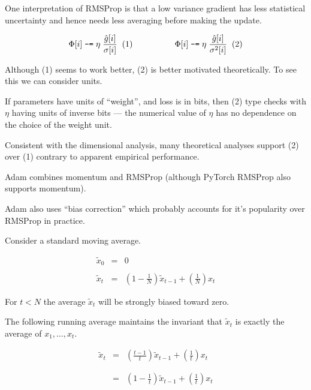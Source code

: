 {\vfill
One interpretation of RMSProp is that a low variance gradient has less statistical uncertainty and hence needs less averaging before making the update.


{\color{red} $$\Phi[i] \;\mbox{\tt -=} \; \eta\;\frac{\hat{g}[i]}{\sigma[i]}\;\;(1)\hspace{5em}\Phi[i] \;\mbox{\tt -=} \; \eta\;\frac{\hat{g}[i]}{\sigma^2[i]}\;\;(2)$$}

\vfill
Although (1) seems to work better, (2) is better motivated theoretically.  To see this we can consider units.

\vfill
If parameters have units of ``weight'', and loss is in bits, then (2) type checks with $\eta$ having units of inverse bits --- the numerical value of $\eta$
has no dependence on the choice of the weight unit.

\vfill
Consistent with the dimensional analysis, many theoretical analyses support (2) over (1) contrary to apparent empirical performance.

Adam combines momentum and RMSProp (although PyTorch RMSProp also supports momentum).

\vfill
Adam also uses ``bias correction'' which probably accounts for it's popularity over RMSProp in practice.


Consider a standard moving average.

\begin{eqnarray*}
\tilde{x}_0 & = & 0 \\
\\
\tilde{x}_t & = & \left(1-\frac{1}{N}\right)\tilde{x}_{t-1} + \left(\frac{1}{N}\right)x_t
\end{eqnarray*}

\vfill
For $t < N$ the average $\tilde{x}_t$ will be strongly biased toward zero.


The following running average maintains the invariant that $\tilde{x}_t$ is exactly the average of $x_1,\ldots,x_t$.

\begin{eqnarray*}
\tilde{x}_t & = & \left(\frac{t-1}{t}\right)\tilde{x}_{t-1} + \left(\frac{1}{t}\right)x_t \\
\\
\\
& = & \left(1-\frac{1}{t}\right)\tilde{x}_{t-1} + \left(\frac{1}{t}\right)x_t
\end{eqnarray*}

}
